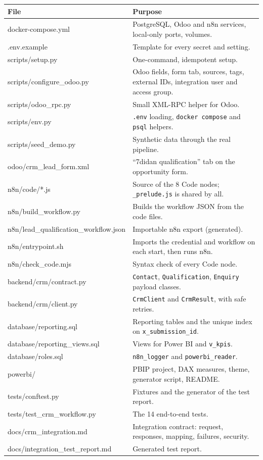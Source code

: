 \documentclass[11pt,a4paper]{article}
\newcommand{\f}[1]{\texttt{#1}}
\begin{document}
\small
\begin{longtable}{>{\ttfamily\raggedright\arraybackslash}p{6.2cm}>{\raggedright\arraybackslash}p{9.4cm}}
  \toprule
  \textrm{\textbf{File}} & \textbf{Purpose} \\
  \midrule
  \endhead
  docker-compose.yml & PostgreSQL, Odoo and n8n services, local-only ports, volumes. \\
  .env.example & Template for every secret and setting. \\
  scripts/setup.py & One-command, idempotent setup. \\
  scripts/configure\_odoo.py & Odoo fields, form tab, sources, tags, external IDs, integration user and access group. \\
  scripts/odoo\_rpc.py & Small XML-RPC helper for Odoo. \\
  scripts/env.py & \f{.env} loading, \f{docker compose} and \f{psql} helpers. \\
  scripts/seed\_demo.py & Synthetic data through the real pipeline. \\
  odoo/crm\_lead\_form.xml & ``7didan qualification'' tab on the opportunity form. \\
  n8n/code/*.js & Source of the 8 Code nodes; \f{\_prelude.js} is shared by all. \\
  n8n/build\_workflow.py & Builds the workflow JSON from the code files. \\
  n8n/lead\_qualification\_\allowbreak workflow.json & Importable n8n export (generated). \\
  n8n/entrypoint.sh & Imports the credential and workflow on each start, then runs n8n. \\
  n8n/check\_code.mjs & Syntax check of every Code node. \\
  backend/crm/contract.py & \f{Contact}, \f{Qualification}, \f{Enquiry} payload classes. \\
  backend/crm/client.py & \f{CrmClient} and \f{CrmResult}, with safe retries. \\
  database/reporting.sql & Reporting tables and the unique index on \f{x\_submission\_id}. \\
  database/reporting\_views.sql & Views for Power BI and \f{v\_kpis}. \\
  database/roles.sql & \f{n8n\_logger} and \f{powerbi\_reader}. \\
  powerbi/ & PBIP project, DAX measures, theme, generator script, README. \\
  tests/conftest.py & Fixtures and the generator of the test report. \\
  tests/test\_crm\_workflow.py & The 14 end-to-end tests. \\
  docs/crm\_integration.md & Integration contract: request, responses, mapping, failures, security. \\
  docs/integration\_test\_report.md & Generated test report. \\
  \bottomrule
\end{longtable}
\normalsize
\end{document}
